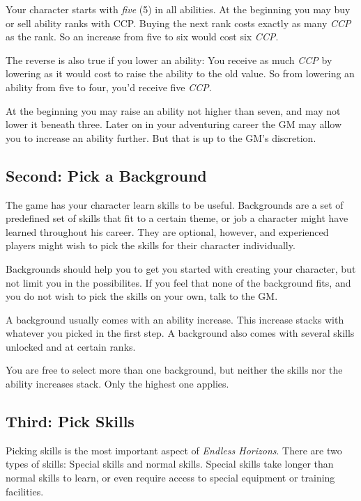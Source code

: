 \documentclass[11pt,a4paper,openany]{scrbook}
\begin{document}
Your character starts with \emph{five} (5) in all abilities. At the beginning
you may buy or sell ability ranks with CCP. Buying the next rank costs exactly
as many \emph{CCP} as the rank. So an increase from five to six would cost six
\emph{CCP}.

The reverse is also true if you lower an ability: You receive as much \emph{CCP}
by lowering as it would cost to raise the ability to the old value. So from
lowering an ability from five to four, you'd receive five \emph{CCP}.

At the beginning you may raise an ability not higher than seven, and may not
lower it beneath three. Later on in your adventuring career the GM may allow you
to increase an ability further. But that is up to the GM's discretion.

\subsection{Second: Pick a Background}

The game has your character learn skills to be useful. Backgrounds are a set of
predefined set of skills that fit to a certain theme, or job a character might
have learned throughout his career. They are optional, however, and experienced
players might wish to pick the skills for their character individually.

Backgrounds should help you to get you started with creating your character, but
not limit you in the possibilites. If you feel that none of the background fits,
and you do not wish to pick the skills on your own, talk to the GM.

A background usually comes with an ability increase. This increase stacks with
whatever you picked in the first step. A background also comes with several
skills unlocked and at certain ranks.

You are free to select more than one background, but neither the skills nor the
ability increases stack. Only the highest one applies.

\subsection{Third: Pick Skills}

Picking skills is the most important aspect of \emph{Endless Horizons}. There
are two types of skills: Special skills and normal skills. Special skills take
longer than normal skills to learn, or even require access to special equipment
or training facilities.
\end{document}
